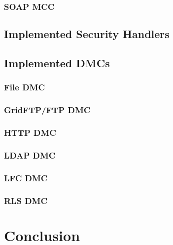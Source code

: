 \documentclass{book}
\begin{document}
\subsection{SOAP MCC}


\section{Implemented Security Handlers}


\section{Implemented DMCs}


\subsection{File DMC}


\subsection{GridFTP/FTP DMC}


\subsection{HTTP DMC}


\subsection{LDAP DMC}


\subsection{LFC DMC}


\subsection{RLS DMC}


\chapter{Conclusion}
\end{document}
